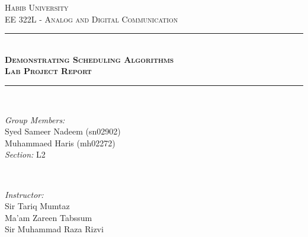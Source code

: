 \documentclass[12pt]{article}
\begin{document}
\setlength{\parskip}{10pt} %
\setlength{\parindent}{0pt}

\begin{titlepage}

\newcommand{\HRule}{\rule{\linewidth}{0.5mm}} %

\center %
 

\textsc{\LARGE Habib University}\\[1.5cm] %
\textsc{\Large EE 322L - Analog and Digital Communication}\\[0.5cm] %


\HRule \\[0.4cm]
{ \huge \bfseries \textsc{Demonstrating Scheduling Algorithms} }\\[0.4cm] %
{ \large \bfseries \textsc{Lab Project Report} }\\[0.4cm] 
\HRule \\[1.5cm]
 
\begin{minipage}{0.4\textwidth}
\begin{flushleft} \large
\emph{Group Members:}\\
Syed Sameer Nadeem (sn02902)\\
Muhammaed Haris (mh02272)\\
\emph{Section:}
L2\\
\end{flushleft}
\end{minipage}
~
\begin{minipage}{0.4\textwidth}
\begin{flushright} \large
\emph{Instructor:} \\
Sir Tariq Mumtaz \\
Ma'am Zareen Tabssum\\
Sir Muhammad Raza Rizvi
\end{flushright}
\end{minipage}\\[2cm]


\end{titlepage}
\end{document}
